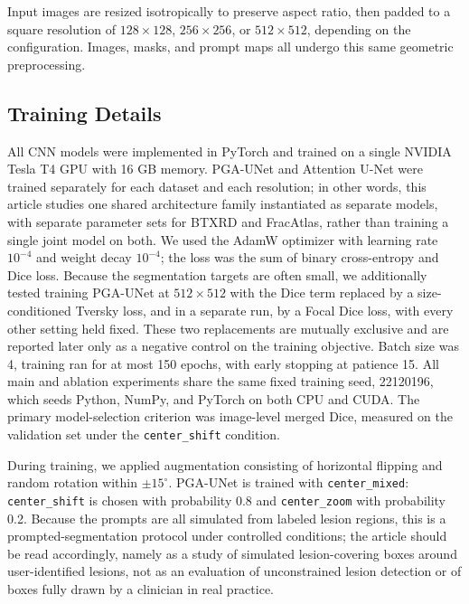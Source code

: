 Input images are resized isotropically to preserve aspect ratio, then padded to a square resolution of $128\times128$, $256\times256$, or $512\times512$, depending on the configuration. Images, masks, and prompt maps all undergo this same geometric preprocessing.

\subsection{Training Details}
\label{sec:training}
All CNN models were implemented in PyTorch and trained on a single NVIDIA Tesla T4 GPU with 16 GB memory. PGA-UNet and Attention U-Net were trained separately for each dataset and each resolution; in other words, this article studies one shared architecture family instantiated as separate models, with separate parameter sets for BTXRD and FracAtlas, rather than training a single joint model on both. We used the AdamW optimizer with learning rate $10^{-4}$ and weight decay $10^{-4}$; the loss was the sum of binary cross-entropy and Dice loss. Because the segmentation targets are often small, we additionally tested training PGA-UNet at $512\times512$ with the Dice term replaced by a size-conditioned Tversky loss, and in a separate run, by a Focal Dice loss, with every other setting held fixed. These two replacements are mutually exclusive and are reported later only as a negative control on the training objective. Batch size was 4, training ran for at most 150 epochs, with early stopping at patience 15. All main and ablation experiments share the same fixed training seed, 22120196, which seeds Python, NumPy, and PyTorch on both CPU and CUDA. The primary model-selection criterion was image-level merged Dice, measured on the validation set under the \texttt{center\_shift} condition.

During training, we applied augmentation consisting of horizontal flipping and random rotation within $\pm15^\circ$. PGA-UNet is trained with \texttt{center\_mixed}: \texttt{center\_shift} is chosen with probability 0.8 and \texttt{center\_zoom} with probability 0.2. Because the prompts are all simulated from labeled lesion regions, this is a prompted-segmentation protocol under controlled conditions; the article should be read accordingly, namely as a study of simulated lesion-covering boxes around user-identified lesions, not as an evaluation of unconstrained lesion detection or of boxes fully drawn by a clinician in real practice.

